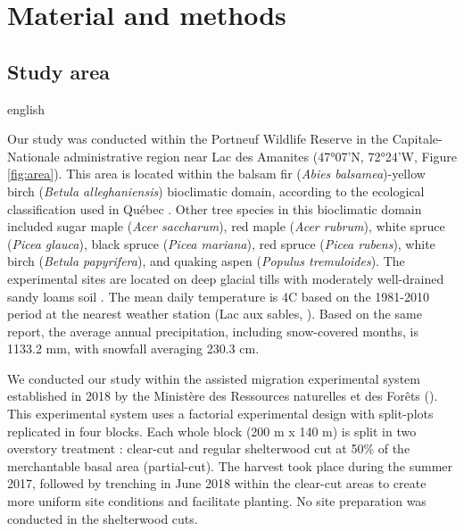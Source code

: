 \section*{Material and methods}
\label{sec:matmet1}

\subsection*{Study area}
\label{subsec:area}

\begin{otherlanguage*}{english}

  Our study was conducted within the Portneuf Wildlife Reserve in the Capitale-Nationale administrative region near Lac des Amanites (47°07’N, 72°24’W, Figure \ref{fig:area}). 
  This area is located within the balsam fir (\textit{Abies balsamea})-yellow birch (\textit{Betula alleghaniensis}) bioclimatic domain, according to the ecological classification used in Québec \citep{saucierChapitreEcologieForestiere2009}. 
  Other tree species in this bioclimatic domain included sugar maple (\textit{Acer saccharum}), red maple (\textit{Acer rubrum}), white spruce (\textit{Picea glauca}), black spruce (\textit{Picea mariana}), red spruce (\textit{Picea rubens}), white birch (\textit{Betula papyrifera}), and quaking aspen (\textit{Populus tremuloides})\citep{olaBelowgroundCarbonStocks2024}. 
  The experimental sites are located on deep glacial tills with moderately well-drained sandy loams soil \citep{CanadianSystemSoil1998}. 
  The mean daily temperature is 4C based on the 1981-2010 period at the nearest weather station (Lac aux sables, \citealp{environmentcanadaCanadianClimateNormals2019}). 
  Based on the same report, the average annual precipitation, including snow-covered months, is 1133.2 mm, with snowfall averaging 230.3 cm.

  We conducted our study within the assisted migration experimental system established in 2018 by the Ministère des Ressources naturelles et des Forêts (\citealp{royoDesiredREgenerationAssisted2023}). 
  This experimental system uses a factorial experimental design with split-plots replicated in four blocks. 
  Each whole block (200 m x 140 m) is split in two overstory treatment : clear-cut and regular shelterwood cut at 50\% of the merchantable basal area (partial-cut). 
  The harvest took place during the summer 2017, followed by trenching in June 2018 within the clear-cut areas to create more uniform site conditions and facilitate planting. 
  No site preparation was conducted in the shelterwood cuts.

\end{otherlanguage*}


